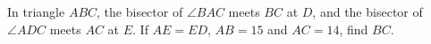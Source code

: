 In triangle $ABC$, the bisector of $\angle BAC$ meets $BC$ at $D$, and the bisector of $\angle ADC$ meets $AC$ at $E$. If $AE=ED$, $AB=15$ and $AC=14$, find $BC$.

